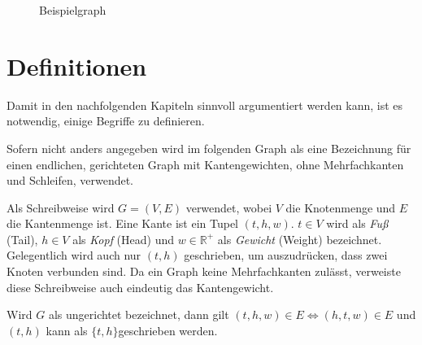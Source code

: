 \begin{figure}[ht]
    \caption{Beispielgraph}
    \label{graphs:fig:beispielgraph}
\end{figure}

\section{Definitionen}
Damit in den nachfolgenden Kapiteln sinnvoll argumentiert werden kann, ist es notwendig, einige Begriffe zu definieren.

\begin{definition}[Graph]
    Sofern nicht anders angegeben wird im folgenden Graph als eine Bezeichnung für einen endlichen, gerichteten Graph mit Kantengewichten, ohne Mehrfachkanten und Schleifen, verwendet.

    Als Schreibweise wird $G = (V, E)$ verwendet, wobei $V$ die Knotenmenge und $E$ die Kantenmenge ist. Eine Kante ist ein Tupel $(t, h, w)$. $t \in V$ wird als \emph{Fuß} (Tail), $h \in V$ als \emph{Kopf} (Head) und $w \in \mathbb{R}^+$ als \emph{Gewicht} (Weight) bezeichnet. Gelegentlich wird auch nur $(t, h)$ geschrieben, um auszudrücken, dass zwei Knoten verbunden sind. Da ein Graph keine Mehrfachkanten zulässt, verweiste diese Schreibweise auch eindeutig das Kantengewicht.

    Wird $G$ als ungerichtet bezeichnet, dann gilt $(t, h, w) \in E \Leftrightarrow (h, t, w) \in E$ und $(t, h)$ kann als $\{ t, h \}$geschrieben werden.
\end{definition}

